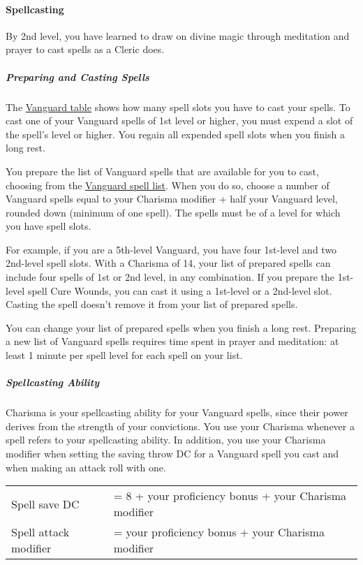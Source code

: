 \paragraph{Spellcasting}\label{vanguard-feature-spellcasting}

By 2nd level, you have learned to draw on divine magic through
meditation and prayer to cast spells as a Cleric does.

\subparagraph{Preparing and Casting
Spells}\label{_preparing_and_casting_spells_2}

The \hyperref[vanguard-table]{Vanguard table} shows how many spell slots
you have to cast your spells. To cast one of your Vanguard spells of 1st
level or higher, you must expend a slot of the spell's level or higher.
You regain all expended spell slots when you finish a long rest.

You prepare the list of Vanguard spells that are available for you to
cast, choosing from the \hyperref[spell-list-vanguard]{Vanguard spell
list}. When you do so, choose a number of Vanguard spells equal to your
Charisma modifier + half your Vanguard level, rounded down (minimum of
one spell). The spells must be of a level for which you have spell
slots.

For example, if you are a 5th-level Vanguard, you have four 1st-level
and two 2nd-level spell slots. With a Charisma of 14, your list of
prepared spells can include four spells of 1st or 2nd level, in any
combination. If you prepare the 1st-level spell Cure Wounds, you can
cast it using a 1st-level or a 2nd-level slot. Casting the spell doesn't
remove it from your list of prepared spells.

You can change your list of prepared spells when you finish a long rest.
Preparing a new list of Vanguard spells requires time spent in prayer
and meditation: at least 1 minute per spell level for each spell on your
list.

\subparagraph{Spellcasting Ability}\label{_spellcasting_ability_2}

Charisma is your spellcasting ability for your Vanguard spells, since
their power derives from the strength of your convictions. You use your
Charisma whenever a spell refers to your spellcasting ability. In
addition, you use your Charisma modifier when setting the saving throw
DC for a Vanguard spell you cast and when making an attack roll with
one.

\begin{longtable}[]{@{}
  >{\raggedright\arraybackslash}p{}
  >{\raggedright\arraybackslash}p{}@{}}
\toprule\noalign{}
\endhead
\bottomrule\noalign{}
\endlastfoot
Spell save DC & = 8 + your proficiency bonus + your Charisma modifier \\
Spell attack modifier & = your proficiency bonus + your Charisma
modifier \\
\end{longtable}

